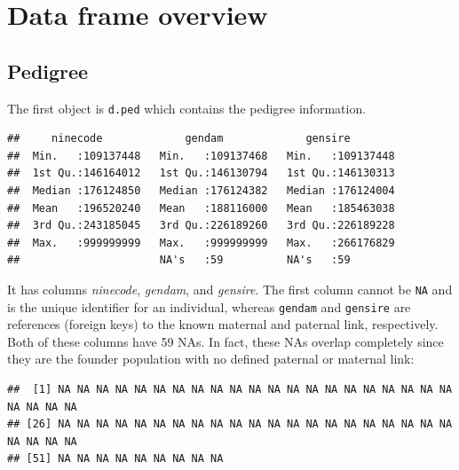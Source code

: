 \hypertarget{data-frame-overview}{%
\section*{Data frame overview}\label{data-frame-overview}}

\hypertarget{pedigree}{%
\subsection*{Pedigree}\label{pedigree}}

The first object is \texttt{d.ped} which contains the pedigree
information.

\begin{Shaded}
\begin{Highlighting}[]
\end{Highlighting}
\end{Shaded}

\begin{verbatim}
##     ninecode             gendam             gensire         
##  Min.   :109137448   Min.   :109137468   Min.   :109137448  
##  1st Qu.:146164012   1st Qu.:146130794   1st Qu.:146130313  
##  Median :176124850   Median :176124382   Median :176124004  
##  Mean   :196520240   Mean   :188116000   Mean   :185463038  
##  3rd Qu.:243185045   3rd Qu.:226189260   3rd Qu.:226189228  
##  Max.   :999999999   Max.   :999999999   Max.   :266176829  
##                      NA's   :59          NA's   :59
\end{verbatim}

It has columns \emph{ninecode}, \emph{gendam}, and \emph{gensire}.
The first column cannot be \texttt{NA} and is the unique identifier for
an individual, whereas \texttt{gendam} and \texttt{gensire} are
references (foreign keys) to the known maternal and paternal link,
respectively. Both of these columns have 59 NAs. In fact, these NAs
overlap completely since they are the founder population with no defined
paternal or maternal link:

\begin{Shaded}
\begin{Highlighting}[]
\NormalTok{d.ped[}\SpecialCharTok{$}\NormalTok{]}
\end{Highlighting}
\end{Shaded}

\begin{verbatim}
##  [1] NA NA NA NA NA NA NA NA NA NA NA NA NA NA NA NA NA NA NA NA NA NA NA NA NA
## [26] NA NA NA NA NA NA NA NA NA NA NA NA NA NA NA NA NA NA NA NA NA NA NA NA NA
## [51] NA NA NA NA NA NA NA NA NA
\end{verbatim}

